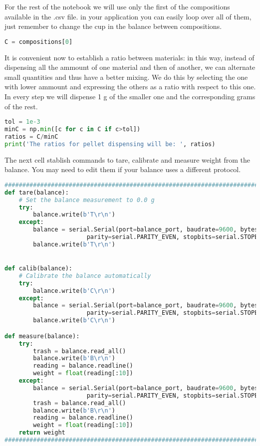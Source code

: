 For the rest of the notebook we will use only the first of the
compositions available in the .csv file. in your application you can
easily loop over all of them, just remember to change the cup in the
balance between compositions.

\begin{lstlisting}[language=Python]
C = compositions[0]
\end{lstlisting}

It is convenient now to establish a ratio between materials: in this
way, instead of dispensing all the ammount of one material and then of
another, we can alternate small quantities and thus have a better
mixing. We do this by selecting the one with lower ammount and
expressing the others as a ratio with respect to this one. In every step
we will dispense 1 g of the smaller one and the corresponding grams of
the rest.

\begin{lstlisting}[language=Python]
tol = 1e-3
minC = np.min([c for c in C if c>tol])
ratios = C/minC 
print('The ratios for pellet dispensing will be: ', ratios)
\end{lstlisting}

The next cell stablish commands to tare, calibrate and measure weight
from the balance. You may need to edit them if your balance uses a
different protocol.

\begin{lstlisting}[language=Python]
###############################################################################
def tare(balance):
    # Set the balance measurement to 0.0 g
    try:
        balance.write(b'T\r\n')
    except:
        balance = serial.Serial(port=balance_port, baudrate=9600, bytesize=serial.SEVENBITS,
                       parity=serial.PARITY_EVEN, stopbits=serial.STOPBITS_ONE)
        balance.write(b'T\r\n')


def calib(balance):
    # Calibrate the balance automatically
    try:
        balance.write(b'C\r\n')
    except:
        balance = serial.Serial(port=balance_port, baudrate=9600, bytesize=serial.SEVENBITS,
                       parity=serial.PARITY_EVEN, stopbits=serial.STOPBITS_ONE)
        balance.write(b'C\r\n')

def measure(balance):
    try:
        trash = balance.read_all()
        balance.write(b'B\r\n')
        reading = balance.readline()
        weight = float(reading[:10])
    except:
        balance = serial.Serial(port=balance_port, baudrate=9600, bytesize=serial.SEVENBITS,
                       parity=serial.PARITY_EVEN, stopbits=serial.STOPBITS_ONE)
        trash = balance.read_all()
        balance.write(b'B\r\n')
        reading = balance.readline()
        weight = float(reading[:10])
    return weight
###############################################################################
\end{lstlisting}

